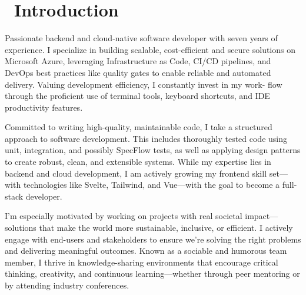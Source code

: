 \section{\faUser\ Introduction}
Passionate backend and cloud-native software developer with seven years of experience. I specialize in building scalable, cost-efficient and secure solutions on Microsoft Azure, leveraging Infrastructure as Code, CI/CD pipelines, and DevOps best practices like quality gates to enable reliable and automated delivery. Valuing development efficiency, I constantly invest in my work-
flow through the proficient use of terminal tools, keyboard shortcuts, and IDE productivity
features.


Committed to writing high-quality, maintainable code, I take a structured approach to software development. This includes thoroughly tested code using unit, integration, and possibly SpecFlow tests, as well as applying design patterns to create robust, clean, and extensible systems. While my expertise lies in backend and cloud development, I am actively growing my frontend skill set—with technologies like Svelte, Tailwind, and Vue—with the goal to become a full-stack developer.

I’m especially motivated by working on projects with real societal impact—solutions that make the world more sustainable, inclusive, or efficient. I actively engage with end-users and stakeholders to ensure we’re solving the right problems and delivering meaningful outcomes. Known as a sociable and humorous team member, I thrive in knowledge-sharing environments that encourage critical thinking, creativity, and continuous learning—whether through peer mentoring or by attending industry conferences.